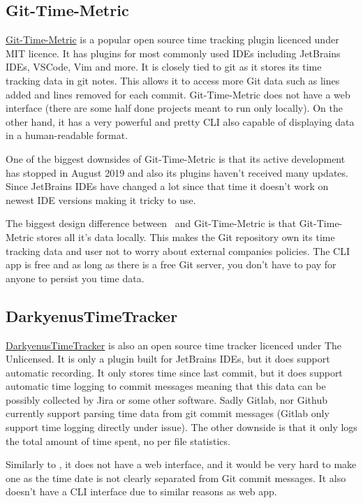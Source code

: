 \subsection{Git-Time-Metric}\label{subsec:git-time-metric}
\href{https://github.com/git-time-metric/gtm}{Git-Time-Metric} is a popular open source time tracking plugin licenced under MIT licence.
It has plugins for most commonly used IDEs including JetBrains IDEs, VSCode, Vim and more.
It is closely tied to git as it stores its time tracking data in git notes.
This allows it to access more Git data such as lines added and lines removed for each commit.
Git-Time-Metric does not have a web interface (there are some half done projects meant to run only locally).
On the other hand, it has a very powerful and pretty CLI also capable of displaying data in a human-readable format.

One of the biggest downsides of Git-Time-Metric is that its active development has stopped in August 2019 and also its plugins haven't received many updates.
Since JetBrains IDEs have changed a lot since that time it doesn't work on newest IDE versions making it tricky to use.

The biggest design difference between~ and Git-Time-Metric is that Git-Time-Metric stores all it's data locally.
This makes the Git repository own its time tracking data and user not to worry about external companies policies.
The CLI app is free and as long as there is a free Git server, you don't have to pay for anyone to persist you time data.


\subsection{DarkyenusTimeTracker}\label{subsec:darkyenus-time-tracker}
\href{https://github.com/Darkyenus/DarkyenusTimeTracker}{DarkyenusTimeTracker} is also an open source time tracker licenced under The Unlicensed.
It is only a plugin built for JetBrains IDEs, but it does support automatic recording.
It only stores time since last commit, but it does support automatic time logging to commit messages meaning that this data can be possibly collected by Jira or some other software.
Sadly Gitlab, nor Github currently support parsing time data from git commit messages (Gitlab only support time logging directly under issue).
The other downside is that it only logs the total amount of time spent, no per file statistics.

Similarly to
, it does not have a web interface, and it would be very hard to make one as the time date is not clearly separated from Git commit messages.
It also doesn't have a CLI interface due to similar reasons as web app.


